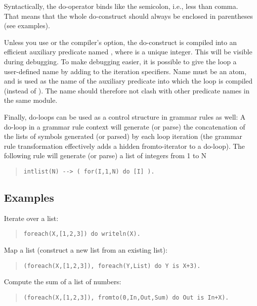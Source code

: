 Syntactically, the do-operator binds like the semicolon, i.e., less than comma.
That means that the whole do-construct should always be enclosed in
parentheses (see examples).

Unless you use  or
the compiler's  option, the do-construct is
compiled into an efficient auxiliary predicate named , where
 is a unique integer. This will be visible during debugging.
To make debugging easier, it is possible to give the loop a
user-defined name by adding %
to the iteration specifiers.  Name must be an atom, and is used as the
name of the auxiliary predicate into which the loop is compiled
(instead of ).  The name should therefore not clash with other
predicate names in the same module.

Finally, do-loops can be used as a control structure in grammar rules as well:
A do-loop in a grammar rule context will generate (or parse) the
concatenation of the lists of symbols generated (or parsed) by each
loop iteration (the grammar rule transformation effectively adds a
hidden fromto-iterator to a do-loop).
The following rule will generate (or parse) a list of integers from 1 to N
\begin{quote}\begin{verbatim}
intlist(N) --> ( for(I,1,N) do [I] ).
\end{verbatim}\end{quote}


\subsection{Examples}

Iterate over a list:
\begin{quote}
\begin{verbatim}
foreach(X,[1,2,3]) do writeln(X).
\end{verbatim}
\end{quote}

Map a list (construct a new list from an existing list):
\begin{quote}
\begin{verbatim}
(foreach(X,[1,2,3]), foreach(Y,List) do Y is X+3).
\end{verbatim}
\end{quote}

Compute the sum of a list of numbers:
\begin{quote}
\begin{verbatim}
(foreach(X,[1,2,3]), fromto(0,In,Out,Sum) do Out is In+X).
\end{verbatim}
\end{quote}

